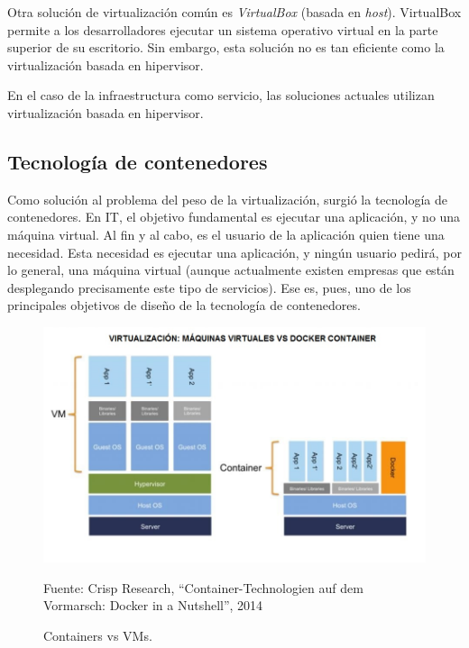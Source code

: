 Otra solución de virtualización común es \textit{VirtualBox} (basada en \textit{host}). VirtualBox permite a los desarrolladores ejecutar un sistema operativo virtual en la parte superior de su escritorio. Sin embargo, esta solución no es tan eficiente como la virtualización basada en hipervisor.


En el caso de la infraestructura como servicio, las soluciones actuales utilizan virtualización basada en hipervisor.

\subsection{Tecnología de contenedores}
Como solución al problema del peso de la virtualización, surgió la tecnología de contenedores. En IT, el objetivo fundamental es ejecutar una aplicación, y no una máquina virtual. Al fin y al cabo, es el usuario de la aplicación quien tiene una necesidad. Esta necesidad es ejecutar una aplicación, y ningún usuario pedirá, por lo general, una máquina virtual (aunque actualmente existen empresas que están desplegando precisamente este tipo de servicios). Ese es, pues, uno de los principales objetivos de diseño de la tecnología de contenedores.

\begin{figure}
    \centering
    \includegraphics[width=1\textwidth]{imagenes/capitulo1/docker-vm-container.png}
    \caption{Containers vs VMs.}
	\vspace{0.3cm}
    \footnotesize{Fuente: Crisp Research, “Container-Technologien auf dem Vormarsch: Docker in a Nutshell”, 2014}
    \label{Container vs VM}
\end{figure}

